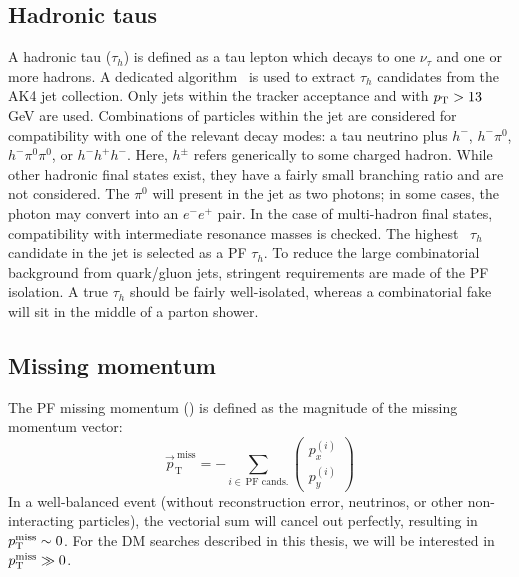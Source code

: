 \subsection{Hadronic taus}

A hadronic tau ($\tau_h$) is defined as a tau lepton which decays to one $\nu_\tau$ and one or more hadrons.
A dedicated algorithm~\cite{cmspf,tauid} is used to extract $\tau_h$ candidates from the AK4 jet collection.
Only jets within the tracker acceptance and with $p_\mathrm{T}>13$ GeV are used.
Combinations of particles within the jet are considered for compatibility with one of the relevant decay modes: a tau neutrino plus $h^-$, $h^-\pi^0$, $h^-\pi^0\pi^0$, or $h^-h^+h^-$.
Here, $h^\pm$ refers generically to some charged hadron.
While other hadronic final states exist, they have a fairly small branching ratio and are not considered.
The $\pi^0$ will present in the jet as two photons; in some cases, the photon may convert into an $e^-e^+$ pair. 
In the case of multi-hadron final states, compatibility with intermediate resonance masses is checked.
The highest \pt~$\tau_h$ candidate in the jet is selected as a PF $\tau_h$.
To reduce the large combinatorial background from quark/gluon jets, stringent requirements are made of the PF isolation.
A true $\tau_h$ should be fairly well-isolated, whereas a combinatorial fake will sit in the middle of a parton shower. 

\subsection{Missing momentum}
\label{sec:cms:met}

The PF missing momentum (\ptmiss) is defined as the magnitude of the missing momentum vector:
\begin{equation}
    \vec{p}_\mathrm{T}^\mathrm{~miss} = -\sum_{i\in\,\text{PF cands.}} \left(\begin{matrix} p_x^{(i)} \\ p_y^{(i)} \end{matrix}\right)
\end{equation}
In a well-balanced event (without reconstruction error, neutrinos, or other non-interacting particles), the vectorial sum will cancel out perfectly, resulting in $p_\mathrm{T}^\mathrm{miss}\sim 0$. 
For the DM searches described in this thesis, we will be interested in $p_\mathrm{T}^\mathrm{miss} \gg 0$.

